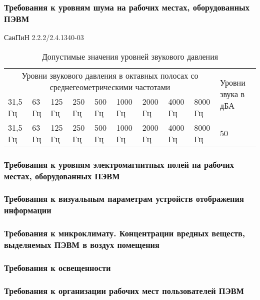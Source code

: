 \subsubsection{Требования к уровням шума на рабочих местах, оборудованных ПЭВМ}


СанПиН 2.2.2/2.4.1340-03

\begin{table}[h!]
\caption{ Допустимые значения уровней звукового давления }
\label{tab:life_1}
\begin{center}
\begin{tabularx}{\linewidth}{|X|X|X|X|X|X|X|X|X|X|}
\hline
\multicolumn{9}{|c|}{Уровни звукового давления в октавных полосах со среднегеометрическими частотами} & \multirow{2}{\hsize}{Уровни звука в дБА}\\
\cline{1-9}
31,5 Гц & 63 Гц & 125 Гц & 250 Гц & 500 Гц & 1000 Гц & 2000 Гц & 4000 Гц & 8000 Гц & \\
\hline
31,5 Гц & 63 Гц & 125 Гц & 250 Гц & 500 Гц & 1000 Гц & 2000 Гц & 4000 Гц & 8000 Гц & 50\\
\hline
\end{tabularx}
\end{center}
\end{table}




\subsubsection{Требования к уровням электромагнитных полей на рабочих местах, оборудованных ПЭВМ}

\subsubsection{Требования к визуальным параметрам устройств отображения информации}

\subsubsection{Требования к микроклимату. Концентрации вредных веществ, выделяемых ПЭВМ в воздух помещения}

\subsubsection{Требования к освещенности}

\subsubsection{Требования к организации рабочих мест пользователей ПЭВМ}



